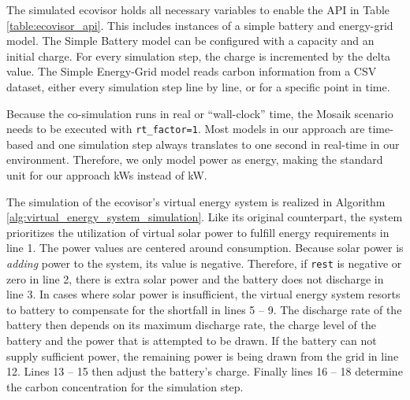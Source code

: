 The simulated ecovisor holds all necessary variables to enable the API in Table
\ref{table:ecovisor_api}. This includes instances of a simple battery and
energy-grid model. The Simple Battery model can be configured with a capacity
and an initial charge. For every simulation step, the charge is incremented by
the delta value. The Simple Energy-Grid model reads carbon information from a
CSV dataset, either every simulation step line by line, or for a specific point
in time.

Because the co-simulation runs in real or \enquote{wall-clock} time, the Mosaik
scenario needs to be executed with \texttt{rt\_factor=1}. Most models in our
approach are time-based and one simulation step always translates to one second
in real-time in our environment. Therefore, we only model power as energy,
making the standard unit for our approach kWs instead of kW.

The simulation of the ecovisor's virtual energy system is realized in Algorithm
\ref{alg:virtual_energy_system_simulation}. Like its original counterpart, the
system prioritizes the utilization of virtual solar power to fulfill energy
requirements in line 1. The power values are centered around consumption.
Because solar power is \emph{adding} power to the system, its value is negative.
Therefore, if \texttt{rest} is negative or zero in line 2, there is extra solar
power and the battery does not discharge in line 3. In cases where solar power
is insufficient, the virtual energy system resorts to battery to compensate for
the shortfall in lines 5 -- 9. The discharge rate of the battery then depends on
its maximum discharge rate, the charge level of the battery and the power that
is attempted to be drawn. If the battery can not supply sufficient power, the
remaining power is being drawn from the grid in line 12. Lines 13 -- 15 then
adjust the battery's charge. Finally lines 16 -- 18 determine the carbon
concentration for the simulation step.

